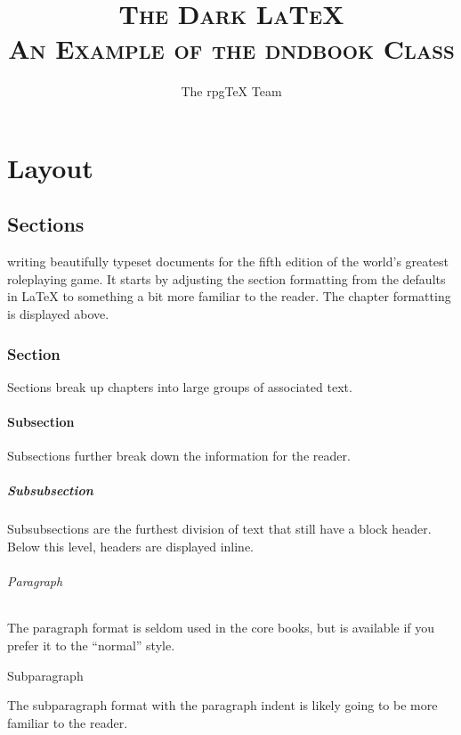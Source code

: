 \documentclass[letterpaper,twocolumn,openany,nodeprecatedcode]{dndbook}
\title{
  \Huge \scshape \fontfamily{pbk}\fontsize{50}{40}\selectfont
  The Dark \LaTeX{} \\
  \medskip
  \normalfont
  \medskip\Huge
  An Example of the dndbook Class
}
\author{The rpgTeX Team}
\date{}
\begin{document}
\frontmatter

\maketitle

\tableofcontents

\mainmatter%

\part{Layout}

\chapter{Sections}

 writing beautifully typeset documents for the fifth edition of the world's greatest roleplaying game. It starts by adjusting the section formatting from the defaults in \LaTeX{} to something a bit more familiar to the reader. The chapter formatting is displayed above.

\section{Section}
Sections break up chapters into large groups of associated text.

\subsection{Subsection}
Subsections further break down the information for the reader.

\subsubsection{Subsubsection}
Subsubsections are the furthest division of text that still have a block header. Below this level, headers are displayed inline.

\paragraph{Paragraph}
The paragraph format is seldom used in the core books, but is available if you prefer it to the ``normal'' style.

\subparagraph{Subparagraph}
The subparagraph format with the paragraph indent is likely going to be more familiar to the reader.
\end{document}
